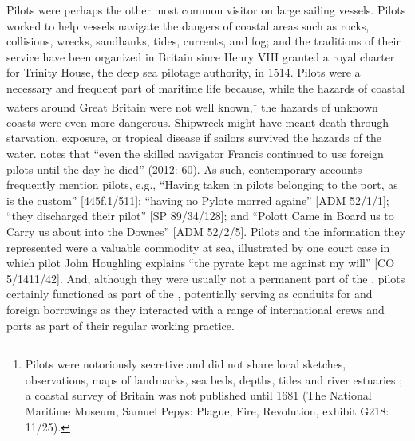Pilots were perhaps the other most common visitor on large sailing vessels. Pilots worked to help vessels navigate the dangers of coastal areas such as rocks, collisions, wrecks, sandbanks, tides, currents, and fog; and the traditions of their service have been organized in Britain since Henry VIII granted a royal charter for Trinity House, the deep sea pilotage authority, in 1514. Pilots were a necessary and frequent part of maritime life because, while the hazards of coastal waters around Great Britain were not well known,\footnote{Pilots were notoriously secretive and did not share local sketches, observations, maps of landmarks, sea beds, depths, tides and river estuaries \citep[64]{Bicheno2012}; a coastal survey of Britain was not published until 1681 (The National Maritime Museum, Samuel Pepys: Plague, Fire, Revolution, exhibit G218: 11/25).}  the hazards of unknown coasts were even more dangerous. Shipwreck might have meant death through starvation, exposure, or tropical disease if sailors survived the hazards of the water. \citeauthor{Bicheno2012} notes that “even the skilled navigator Francis  continued to use foreign pilots until the day he died” (2012: 60). As such, contemporary accounts frequently mention pilots, e.g., “Having taken in pilots belonging to the port, as is the custom” [445f.1/511]; “having no Pylote morred againe” [ADM 52/1/1]; “they discharged their pilot” [SP 89/34/128]; and “Polott Came in Board us to Carry us about into the Downes” [ADM 52/2/5]. Pilots and the information they represented were a valuable commodity at sea, illustrated by one court case in which pilot John Houghling explains “the pyrate kept me against my will” [CO 5/1411/42]. And, although they were usually not a permanent part of the , pilots certainly functioned as part of the , potentially serving as conduits for  and foreign borrowings as they interacted with a range of international crews and ports as part of their regular working practice. 

